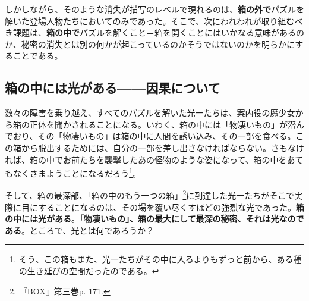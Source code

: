 \documentclass[9pt,b5j,twoside,twocolumn]{utarticle}
\begin{document}
しかしながら、そのような消失が描写のレベルで現れるのは、\textbf{箱の外で}パズルを解いた登場人物たちにおいてのみであった。そこで、次にわれわれが取り組むべき課題は、\textbf{箱の中で}パズルを解くこと＝箱を開くことにはいかなる意味があるのか、秘密の消失とは別の何かが起こっているのかそうではないのかを明らかにすることである。

\subsection{\tbaselineshift =3.0pt 箱の中には光がある------因果について}

数々の障害を乗り越え、すべてのパズルを解いた光一たちは、案内役の魔少女から箱の正体を聞かされることになる。いわく、箱の中には「物凄いもの」が潜んでおり、その「物凄いもの」は箱の中に人間を誘い込み、その一部を食べる。この箱から脱出するためには、自分の一部を差し出さなければならない。さもなければ、箱の中でお前たちを襲撃したあの怪物のような姿になって、箱の中をあてもなくさまようことになるだろう\footnote{そう、この箱もまた、光一たちがその中に入るよりもずっと前から、ある種の生き延びの空間だったのである。}。

そして、箱の最深部、「箱の中のもう一つの箱」\footnote{『BOX』第三巻p. 171.}に到達した光一たちがそこで実際に目にすることになるのは、その場を覆い尽くすほどの強烈な光であった。\textbf{箱の中には光がある}。\textbf{「物凄いもの」、箱の最大にして最深の秘密、それは光なのである}。ところで、光とは何であろうか？
\end{document}
